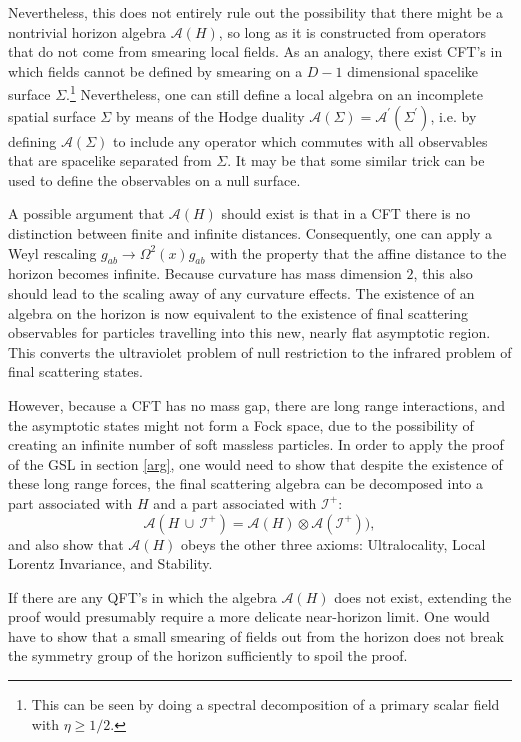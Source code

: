 \documentclass{article}
\begin{document}
Nevertheless, this does not entirely rule out the possibility that there might be a nontrivial horizon algebra $\mathcal{A}(H)$, so long as it is constructed from operators that do not come from smearing local fields.  As an analogy, there exist CFT's in which fields cannot be defined by smearing on a $D - 1$ dimensional spacelike surface $\Sigma$.\footnote{This can be seen by doing a spectral decomposition of a primary scalar field with $\eta \ge 1/2$.}  Nevertheless, one can still define a local algebra on an incomplete spatial surface $\Sigma$ by means of the Hodge duality $\mathcal{A}(\Sigma) = \mathcal{A}^\prime(\Sigma^\prime)$, i.e. by defining $\mathcal{A}(\Sigma)$ to include any operator which commutes with all observables that are spacelike separated from $\Sigma$.  It may be that some similar trick can be used to define the observables on a null surface.

A possible argument that $\mathcal{A}(H)$ should exist is that in a CFT there is no distinction between finite and infinite distances.  Consequently, one can apply a Weyl rescaling $g_{ab} \to \Omega^2(x) g_{ab}$ with the property that the affine distance to the horizon becomes infinite.  Because curvature has mass dimension $2$, this also should lead to the scaling away of any curvature effects.  The existence of an algebra on the horizon is now equivalent to the existence of final scattering observables for particles travelling into this new, nearly flat asymptotic region.  This converts the ultraviolet problem of null restriction to the infrared problem of final scattering states.

However, because a CFT has no mass gap, there are long range interactions, and the asymptotic states might not form a Fock space, due to the possibility of creating an infinite number of soft massless particles.  In order to apply the proof of the GSL in section \ref{arg}, one would need to show that despite the existence of these long range forces, the final scattering algebra can be decomposed into a part associated with $H$ and a part associated with $\mathcal{I}^+$:
\begin{equation}
\mathcal{A}(H\,\cup\,\mathcal{I}^+) = \mathcal{A}(H) \otimes \mathcal{A}(\mathcal{I}^+)),
\end{equation}
and also show that $\mathcal{A}(H)$ obeys the other three axioms: Ultralocality, Local Lorentz Invariance, and Stability.

If there are any QFT's in which the algebra $\mathcal{A}(H)$ does not exist, extending the proof would presumably require a more delicate near-horizon limit.  One would have to show that a small smearing of fields out from the horizon does not break the symmetry group of the horizon sufficiently to spoil the proof.
\end{document}
